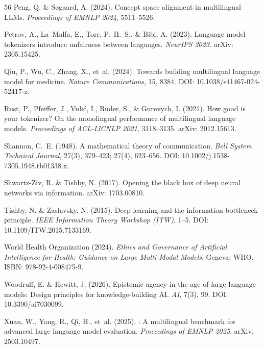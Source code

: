 \documentclass[11pt,a4paper]{article}
\begin{document}
\begin{thebibliography}{56}
Peng, Q. \& S{\o}gaard, A. (2024).
\newblock Concept space alignment in multilingual {LLMs}.
\newblock \emph{Proceedings of EMNLP 2024}, 5511--5526.

Petrov, A., La~Malfa, E., Torr, P.~H.~S., \& Bibi, A. (2023).
\newblock Language model tokenizers introduce unfairness between languages.
\newblock \emph{NeurIPS 2023}.
\newblock arXiv: 2305.15425.

Qiu, P., Wu, C., Zhang, X., et~al. (2024).
\newblock Towards building multilingual language model for medicine.
\newblock \emph{Nature Communications}, 15, 8384.
\newblock DOI: 10.1038/s41467-024-52417-z.

Rust, P., Pfeiffer, J., Vuli\'{c}, I., Ruder, S., \& Gurevych, I. (2021).
\newblock How good is your tokenizer? {O}n the monolingual performance of multilingual language models.
\newblock \emph{Proceedings of ACL-IJCNLP 2021}, 3118--3135.
\newblock arXiv: 2012.15613.

Shannon, C.~E. (1948).
\newblock A mathematical theory of communication.
\newblock \emph{Bell System Technical Journal}, 27(3), 379--423; 27(4), 623--656.
\newblock DOI: 10.1002/j.1538-7305.1948.tb01338.x.

Shwartz-Ziv, R. \& Tishby, N. (2017).
\newblock Opening the black box of deep neural networks via information.
\newblock arXiv: 1703.00810.

Tishby, N. \& Zaslavsky, N. (2015).
\newblock Deep learning and the information bottleneck principle.
\newblock \emph{IEEE Information Theory Workshop (ITW)}, 1--5.
\newblock DOI: 10.1109/ITW.2015.7133169.

{World Health Organization} (2024).
\newblock \emph{Ethics and Governance of Artificial Intelligence for Health: Guidance on Large Multi-Modal Models}.
\newblock Geneva: WHO.
\newblock ISBN: 978-92-4-008475-9.

Woodruff, E. \& Hewitt, J. (2026).
\newblock Epistemic agency in the age of large language models: Design principles for knowledge-building {AI}.
\newblock \emph{AI}, 7(3), 99.
\newblock DOI: 10.3390/ai7030099.

Xuan, W., Yang, R., Qi, H., et~al. (2025).
: A multilingual benchmark for advanced large language model evaluation.
\newblock \emph{Proceedings of EMNLP 2025}.
\newblock arXiv: 2503.10497.


\end{thebibliography}
\end{document}
